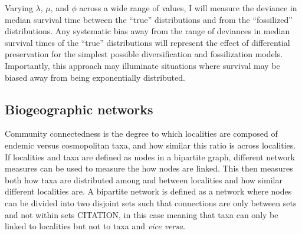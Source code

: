 \documentclass[12pt,letterpaper]{article}
\begin{document}
Varying \(\lambda\), \(\mu\), and \(\phi\) across a wide range of values, I will measure the deviance in median survival time between the ``true'' distributions and from the ``fossilized'' distributions. Any systematic bias away from the range of deviances in median survival times of the ``true'' distributions will represent the effect of differential preservation for the simplest possible diversification and fossilization models. Importantly, this approach may illuminate situations where survival may be biased away from being exponentially distributed.


\subsection{Biogeographic networks} \label{sec:bionet}
Community connectedness is the degree to which localities are composed of endemic versus cosmopolitan taxa, and how similar this ratio is across localities. If localities and taxa are defined as nodes in a bipartite graph, different network measures can be used to measure the how nodes are linked. This then measures both how taxa are distributed among and between localities and how similar different localities are. A bipartite network is defined as a network where nodes can be divided into two disjoint sets such that connections are only between sets and not within sets CITATION, in this case meaning that taxa can only be linked to localities but not to taxa and \textit{vice versa}.
\end{document}
